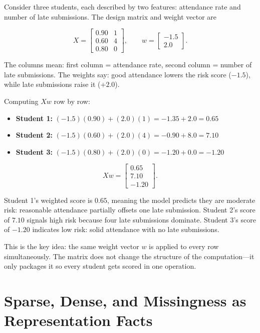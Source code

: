 \begin{example}
Consider three students, each described by two features: attendance rate and number of late submissions. The design matrix and weight vector are

\[
X =
\begin{bmatrix}
0.90 & 1 \\
0.60 & 4 \\
0.80 & 0
\end{bmatrix},
\qquad
w =
\begin{bmatrix}
-1.5 \\
2.0
\end{bmatrix}.
\]

The columns mean: first column = attendance rate, second column = number of late submissions. The weights say: good attendance lowers the risk score (\(-1.5\)), while late submissions raise it (\(+2.0\)).

Computing \(Xw\) row by row:

\begin{itemize}[leftmargin=*]
\item \textbf{Student 1:} \((-1.5)(0.90) + (2.0)(1) = -1.35 + 2.0 = 0.65\)
\item \textbf{Student 2:} \((-1.5)(0.60) + (2.0)(4) = -0.90 + 8.0 = 7.10\)
\item \textbf{Student 3:} \((-1.5)(0.80) + (2.0)(0) = -1.20 + 0.0 = -1.20\)
\end{itemize}

\[
Xw =
\begin{bmatrix}
0.65 \\
7.10 \\
-1.20
\end{bmatrix}.
\]

Student 1's weighted score is \(0.65\), meaning the model predicts they are moderate risk: reasonable attendance partially offsets one late submission. Student 2's score of \(7.10\) signals high risk because four late submissions dominate. Student 3's score of \(-1.20\) indicates low risk: solid attendance with no late submissions.

This is the key idea: the same weight vector \(w\) is applied to every row simultaneously. The matrix does not change the structure of the computation---it only packages it so every student gets scored in one operation.
\end{example}

\section*{Sparse, Dense, and Missingness as Representation Facts}


